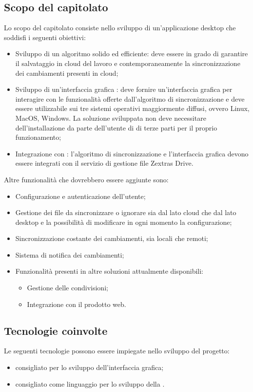 \subsection{Scopo del capitolato}
Lo scopo del capitolato consiste nello sviluppo di un'applicazione desktop che soddisfi i seguenti obiettivi:
\begin{itemize}
	\item Sviluppo di un algoritmo solido ed efficiente: deve essere in grado di garantire il salvataggio in cloud del lavoro e contemporaneamente la sincronizzazione dei cambiamenti presenti in cloud;
	\item Sviluppo di un’interfaccia grafica : deve fornire un'interfaccia grafica per interagire con le funzionalità offerte dall'algoritmo di sincronizzazione e deve essere utilizzabile sui tre sistemi operativi maggiormente diffusi, ovvero Linux, MacOS, Windows. La soluzione sviluppata non deve necessitare dell'installazione da parte dell'utente di  di terze parti per il proprio funzionamento;
	\item Integrazione con : l'algoritmo di sincronizzazione e l'interfaccia grafica devono essere integrati con il servizio di gestione file Zextras Drive.
\end{itemize}
Altre funzionalità che dovrebbero essere aggiunte sono:
\begin{itemize}
	\item Configurazione e autenticazione dell'utente;
	\item Gestione dei file da sincronizzare o ignorare sia dal lato cloud che dal lato desktop e la possibilità di modificare in ogni momento la configurazione;
	\item Sincronizzazione costante dei cambiamenti, sia locali che remoti;
	\item Sistema di notifica dei cambiamenti;
	\item Funzionalità presenti in altre soluzioni attualmente disponibili:
	\begin{itemize}
		\item Gestione delle condivisioni;
		\item Integrazione con il prodotto web.
	\end{itemize}
\end{itemize}

\subsection{Tecnologie coinvolte}
Le seguenti tecnologie possono essere impiegate nello sviluppo del progetto:
\begin{itemize}
	\item {} consigliato per lo sviluppo dell'interfaccia grafica;
	\item {} consigliato come linguaggio per lo sviluppo della .
\end{itemize}

